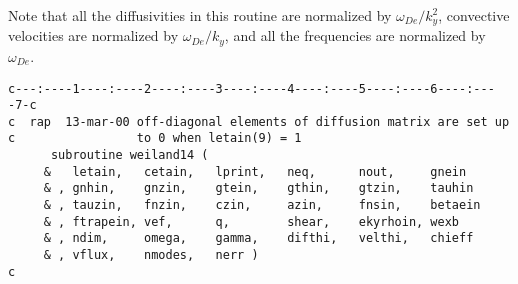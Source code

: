 Note that all the diffusivities in this routine are normalized by
$ \omega_{De} / k_y^2 $,
convective velocities are normalized by $ \omega_{De} / k_y $,
and all the frequencies are normalized by $ \omega_{De} $.
\newpage
\begin{verbatim}
c---:----1----:----2----:----3----:----4----:----5----:----6----:----7-c
c  rap  13-mar-00 off-diagonal elements of diffusion matrix are set up 
c                 to 0 when letain(9) = 1
      subroutine weiland14 (
     &   letain,   cetain,   lprint,   neq,      nout,     gnein
     & , gnhin,    gnzin,    gtein,    gthin,    gtzin,    tauhin
     & , tauzin,   fnzin,    czin,     azin,     fnsin,    betaein
     & , ftrapein, vef,      q,        shear,    ekyrhoin, wexb
     & , ndim,     omega,    gamma,    difthi,   velthi,   chieff
     & , vflux,    nmodes,   nerr )
c
\end{verbatim}
\renewcommand{\arraystretch}{1.0}

